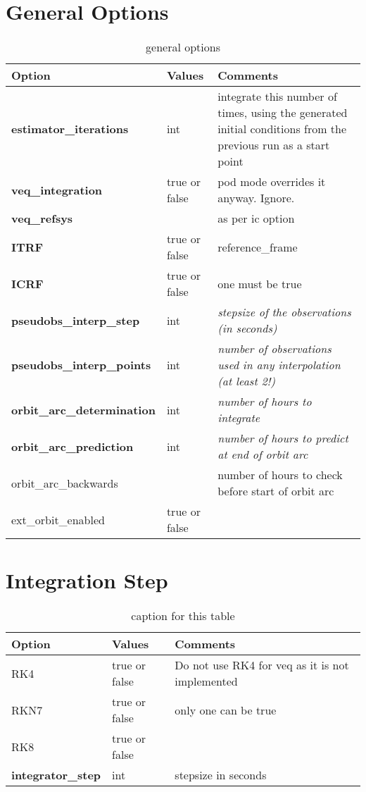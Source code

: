 \section{General Options}
\begin{table}[h!]
	\begin{tabular}{|p{2.5cm}|p{2.5cm}|p{5cm}|}
		\hline
		Option & Values & Comments \\
		\hline
        \textbf{estimator\_iterations} & int & integrate this number of times, using the generated initial conditions from the previous run as a start point\\
        \textbf{veq\_integration}& true or false &   pod mode overrides it anyway. Ignore.\\
        \textbf{veq\_refsys}& &  as per ic option\\
        \hline
        \textbf{ITRF} & true or false & reference\_frame\\
        \textbf{ICRF} & true or false &  one must be true\\       
        \hline
        \textbf{pseudobs\_interp\_step}& int & \emph{stepsize of the observations (in seconds)}\\
        \textbf{pseudobs\_interp\_points}& int & \emph{number of observations used in any interpolation (at least 2!)}\\
        \textbf{orbit\_arc\_determination}& int & \emph{number of hours to integrate}\\
        \textbf{orbit\_arc\_prediction}& int & \emph{number of hours to predict at end of orbit arc}\\
        orbit\_arc\_backwards& & number of hours to check before start of orbit arc\\
        ext\_orbit\_enabled&  true or false & \\ 
		\hline
	\end{tabular}
	\caption{general options}
	\label{table:label_name}
\end{table}

\section{Integration Step}
\begin{table}[h!]
	\begin{tabular}{|p{2.5cm}|p{2.5cm}|p{5cm}|}
		\hline
		Option & Values & Comments \\
		\hline
		RK4 & true or false &  Do not use RK4 for veq as it is not implemented\\ 
		RKN7 & true or false & only one can be true\\ 
		RK8  & true or false & \\
		\hline
		\textbf{integrator\_step} & int & stepsize in seconds \\
		\hline
	\end{tabular}
	\caption{caption for this table}
	\label{table:label_name}
\end{table}
%
